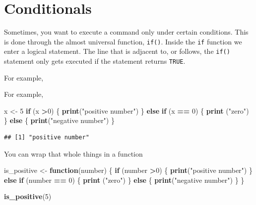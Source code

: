 \documentclass[]{book}
\newenvironment{Shaded}{\begin{snugshade}}{\end{snugshade}}
\newcommand{\ControlFlowTok}[1]{\textcolor[rgb]{0.13,0.29,0.53}{\textbf{#1}}}
\newcommand{\DecValTok}[1]{\textcolor[rgb]{0.00,0.00,0.81}{#1}}
\newcommand{\KeywordTok}[1]{\textcolor[rgb]{0.13,0.29,0.53}{\textbf{#1}}}
\newcommand{\NormalTok}[1]{#1}
\newcommand{\OperatorTok}[1]{\textcolor[rgb]{0.81,0.36,0.00}{\textbf{#1}}}
\newcommand{\StringTok}[1]{\textcolor[rgb]{0.31,0.60,0.02}{#1}}
\theoremstyle{definition}
\theoremstyle{definition}
\theoremstyle{definition}
\theoremstyle{remark}
\begin{document}
\hypertarget{conditionals}{%
\section{Conditionals}\label{conditionals}}

Sometimes, you want to execute a command only under certain conditions. This is done through the almost universal function, \texttt{if()}. Inside the \texttt{if} function we enter a logical statement. The line that is adjacent to, or follows, the \texttt{if()} statement only gets executed if the statement returns \texttt{TRUE}.

For example,

For example,

\begin{Shaded}
\begin{Highlighting}[]
\NormalTok{x <-}\StringTok{ }\DecValTok{5}
\ControlFlowTok{if}\NormalTok{ (x }\OperatorTok{>}\DecValTok{0}\NormalTok{) \{}
  \KeywordTok{print}\NormalTok{(}\StringTok{"positive number"}\NormalTok{)}
\NormalTok{\} }\ControlFlowTok{else} \ControlFlowTok{if}\NormalTok{ (x }\OperatorTok{==}\StringTok{ }\DecValTok{0}\NormalTok{)  \{}
  \KeywordTok{print}\NormalTok{ (}\StringTok{"zero"}\NormalTok{)}
\NormalTok{\} }\ControlFlowTok{else}\NormalTok{ \{}
  \KeywordTok{print}\NormalTok{(}\StringTok{"negative number"}\NormalTok{)}
\NormalTok{\}}
\end{Highlighting}
\end{Shaded}

\begin{verbatim}
## [1] "positive number"
\end{verbatim}

You can wrap that whole things in a function

\begin{Shaded}
\begin{Highlighting}[]
\NormalTok{is_positive <-}\StringTok{ }\ControlFlowTok{function}\NormalTok{(number) \{}
  \ControlFlowTok{if}\NormalTok{ (number }\OperatorTok{>}\DecValTok{0}\NormalTok{) \{}
    \KeywordTok{print}\NormalTok{(}\StringTok{"positive number"}\NormalTok{)}
\NormalTok{  \} }\ControlFlowTok{else} \ControlFlowTok{if}\NormalTok{ (number }\OperatorTok{==}\StringTok{ }\DecValTok{0}\NormalTok{)  \{}
    \KeywordTok{print}\NormalTok{ (}\StringTok{"zero"}\NormalTok{)}
\NormalTok{  \} }\ControlFlowTok{else}\NormalTok{ \{}
    \KeywordTok{print}\NormalTok{(}\StringTok{"negative number"}\NormalTok{)}
\NormalTok{  \}}
\NormalTok{\}}

\KeywordTok{is_positive}\NormalTok{(}\DecValTok{5}\NormalTok{)}
\end{Highlighting}
\end{Shaded}
\end{document}
